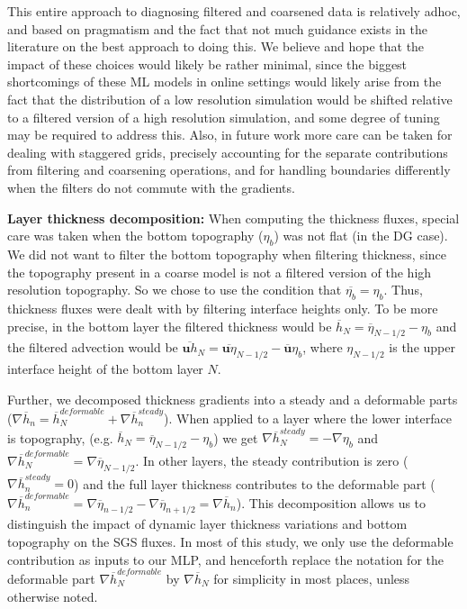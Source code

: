 \documentclass[draft]{agujournal2019}
\begin{document}

This entire approach to diagnosing filtered and coarsened data is relatively adhoc, and based on pragmatism and the fact that not much guidance exists in the literature on the best approach to doing this. We believe and hope that the impact of these choices would likely be rather minimal, since the biggest shortcomings of these ML models in online settings would likely arise from the fact that the distribution of a low resolution simulation would be shifted relative to a filtered version of a high resolution simulation, and some degree of tuning may be required to address this.
Also, in future work more care can be taken for dealing with staggered grids, precisely accounting for the separate contributions from filtering and coarsening operations, and for handling boundaries differently when the filters do not commute with the gradients. 

\textbf{Layer thickness decomposition:}
When computing the thickness fluxes, special care was taken when the bottom topography ($\eta_{b}$) was not flat (in the DG case). We did not want to filter the bottom topography when filtering thickness, since the topography present in a coarse model is not a filtered version of the high resolution topography. So we chose to use the condition that $\overline{\eta_{b}} = \eta_{b}$.
Thus, thickness fluxes were dealt with by filtering interface heights only. To be more precise, in the bottom layer the filtered thickness would be $\overline{h}_N = \overline{\eta}_{N-1/2} - \eta_{b}$ and the filtered advection would be $\overline{\mathbf{u} h}_N = \overline{\mathbf{u} \eta}_{N-1/2} - \overline{\mathbf{u}} \eta_{b}$, where $\eta_{N-1/2}$ is the upper interface height of the bottom layer $N$.

Further, we decomposed thickness gradients into a steady and a deformable parts ($\nabla \overline{h}_n = \overline{h}_N^{deformable} + \nabla \overline{h}_n^{steady}$). When applied to a layer where the lower interface is topography, (e.g. $\overline{h}_N = \overline{\eta}_{N-1/2} - \eta_{b}$) we get $\nabla \overline{h}_N^{steady} = - \nabla \eta_{b}$ and $\nabla \overline{h}_N^{deformable} = \nabla \overline{\eta}_{N-1/2}$. In other layers, the steady contribution is zero ($\nabla \overline{h}_n^{steady}=0$) and the full layer thickness contributes to the deformable part ($\nabla \overline{h}_n^{deformable} = \nabla \overline{\eta}_{n-1/2} - \nabla \overline{\eta}_{n+1/2} = \nabla \overline{h}_n$).
This decomposition allows us to distinguish the impact of dynamic layer thickness variations and bottom topography on the SGS fluxes. In most of this study, we only use the deformable contribution as inputs to our MLP, and henceforth replace the notation for the deformable part $\nabla \overline{h}_N^{deformable}$ by $\nabla \overline{h}_N$ for simplicity in most places, unless otherwise noted. 
\end{document}
